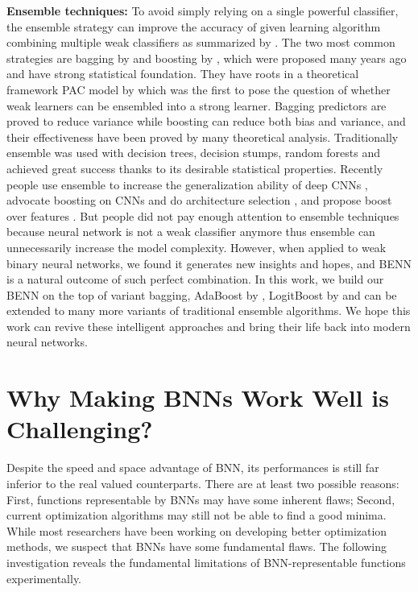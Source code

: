\documentclass[10pt,twocolumn,letterpaper]{article}
\begin{document}
\textbf{Ensemble techniques: }To avoid simply relying on a single powerful classifier, the ensemble strategy can improve the accuracy of given learning algorithm combining multiple weak classifiers as summarized by \cite{breiman1996bias, carney1999confidence, oza2001online}. The two most common strategies are bagging by \cite{breiman1996bagging} and boosting by \cite{schapire2003boosting, friedman2000additive, schapire1999improved, hastie2009multi}, which were proposed many years ago and have strong statistical foundation. They have roots in a theoretical framework PAC model by \cite{valiant1984theory} which was the first to pose the question of whether weak learners can be ensembled into a strong learner. Bagging predictors are proved to reduce variance while boosting can reduce both bias and variance, and their effectiveness have been proved by many theoretical analysis. Traditionally ensemble was used with decision trees, decision stumps, random forests and achieved great success thanks to its desirable statistical properties. Recently people use ensemble to increase the generalization ability of deep CNNs \cite{han2016incremental}, advocate boosting on CNNs and do architecture selection \cite{moghimi2016boosted}, and propose boost over features \cite{huang2017learning}. But people did not pay enough attention to ensemble techniques because neural network is not a weak classifier anymore thus ensemble can unnecessarily increase the model complexity. However, when applied to weak binary neural networks, we found it generates new insights and hopes, and BENN is a natural outcome of such perfect combination. In this work, we build our BENN on the top of variant bagging, AdaBoost by  \cite{freund1995desicion, schapire2013explaining}, LogitBoost by \cite{friedman2000additive} and can be extended to many more variants of traditional ensemble algorithms. We hope this work can revive these intelligent approaches and bring their life back into modern neural networks. 

\section{Why Making BNNs Work Well is Challenging?}
\label{sec:inspiration}
Despite the speed and space advantage of BNN, its performances is still far inferior to the real valued counterparts. There are at least two possible reasons: First, functions representable by BNNs may have some inherent flaws; Second, current optimization algorithms may still not be able to find a good minima. While most researchers have been working on developing better optimization methods, we suspect that BNNs have some fundamental flaws. The following investigation reveals the fundamental limitations of BNN-representable functions experimentally. 
\end{document}
